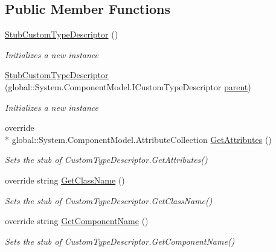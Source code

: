 \subsection*{Public Member Functions}
\begin{DoxyCompactItemize}
\item 
\hyperlink{class_system_1_1_component_model_1_1_fakes_1_1_stub_custom_type_descriptor_ae4877e172b79f379410ee071dd4acce2}{Stub\-Custom\-Type\-Descriptor} ()
\begin{DoxyCompactList}\small\item\em Initializes a new instance\end{DoxyCompactList}\item 
\hyperlink{class_system_1_1_component_model_1_1_fakes_1_1_stub_custom_type_descriptor_a16c2d2b40fdeb5f394dbfe207edd22cc}{Stub\-Custom\-Type\-Descriptor} (global\-::\-System.\-Component\-Model.\-I\-Custom\-Type\-Descriptor \hyperlink{jquery-1_810_82-vsdoc_8js_aed9b5e7a755bcccb282f9b06c00a6822}{parent})
\begin{DoxyCompactList}\small\item\em Initializes a new instance\end{DoxyCompactList}\item 
override \\*
global\-::\-System.\-Component\-Model.\-Attribute\-Collection \hyperlink{class_system_1_1_component_model_1_1_fakes_1_1_stub_custom_type_descriptor_a29c8ec8fd90fc1221258b2e56238365f}{Get\-Attributes} ()
\begin{DoxyCompactList}\small\item\em Sets the stub of Custom\-Type\-Descriptor.\-Get\-Attributes()\end{DoxyCompactList}\item 
override string \hyperlink{class_system_1_1_component_model_1_1_fakes_1_1_stub_custom_type_descriptor_a46271c2b40d8ede5548f554cc5126ecc}{Get\-Class\-Name} ()
\begin{DoxyCompactList}\small\item\em Sets the stub of Custom\-Type\-Descriptor.\-Get\-Class\-Name()\end{DoxyCompactList}\item 
override string \hyperlink{class_system_1_1_component_model_1_1_fakes_1_1_stub_custom_type_descriptor_aee226eaae7135d98a46468913d378787}{Get\-Component\-Name} ()
\begin{DoxyCompactList}\small\item\em Sets the stub of Custom\-Type\-Descriptor.\-Get\-Component\-Name()\end{DoxyCompactList}\item 

\end{DoxyCompactItemize}
